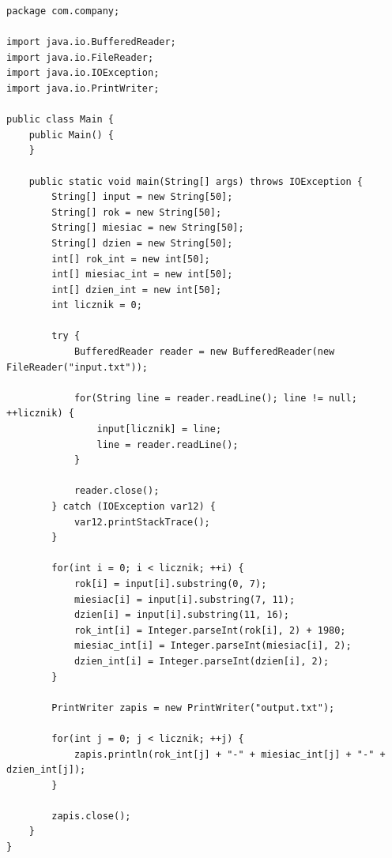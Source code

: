 \documentclass[12pt,a4paper]{article}
\begin{document}
\begin{itemize}
\begin{lstlisting}
package com.company;

import java.io.BufferedReader;
import java.io.FileReader;
import java.io.IOException;
import java.io.PrintWriter;

public class Main {
    public Main() {
    }

    public static void main(String[] args) throws IOException {
        String[] input = new String[50];
        String[] rok = new String[50];
        String[] miesiac = new String[50];
        String[] dzien = new String[50];
        int[] rok_int = new int[50];
        int[] miesiac_int = new int[50];
        int[] dzien_int = new int[50];
        int licznik = 0;

        try {
            BufferedReader reader = new BufferedReader(new FileReader("input.txt"));

            for(String line = reader.readLine(); line != null; ++licznik) {
                input[licznik] = line;
                line = reader.readLine();
            }

            reader.close();
        } catch (IOException var12) {
            var12.printStackTrace();
        }

        for(int i = 0; i < licznik; ++i) {
            rok[i] = input[i].substring(0, 7);
            miesiac[i] = input[i].substring(7, 11);
            dzien[i] = input[i].substring(11, 16);
            rok_int[i] = Integer.parseInt(rok[i], 2) + 1980;
            miesiac_int[i] = Integer.parseInt(miesiac[i], 2);
            dzien_int[i] = Integer.parseInt(dzien[i], 2);
        }

        PrintWriter zapis = new PrintWriter("output.txt");

        for(int j = 0; j < licznik; ++j) {
            zapis.println(rok_int[j] + "-" + miesiac_int[j] + "-" + dzien_int[j]);
        }

        zapis.close();
    }
}


	\end{lstlisting}
	\end{itemize}
\end{document}
